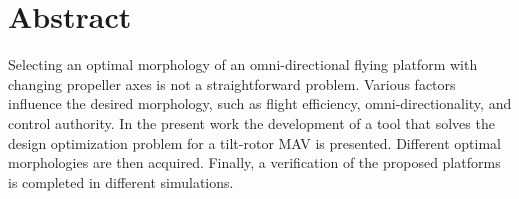 \chapter*{Abstract}
Selecting an optimal morphology of an omni-directional flying platform with changing
propeller axes is not a straightforward problem. Various factors influence the desired
morphology, such as flight efficiency, omni-directionality, and control authority.
In the present work the development of a tool that solves the design optimization
problem for a tilt-rotor MAV is presented. Different optimal morphologies are
then acquired. Finally, a verification of the proposed platforms is completed
in different simulations.
